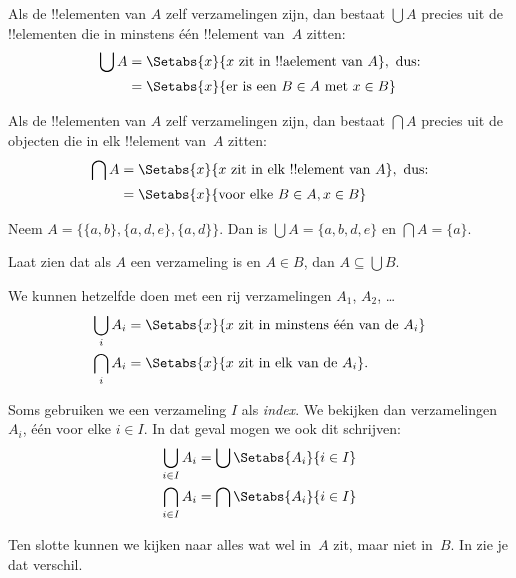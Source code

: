 \documentclass[../../../include/open-logic-section]{subfiles}
\begin{document}
\begin{defn}
Als de !!{element}en van $A$ zelf verzamelingen zijn, dan bestaat $\bigcup A$
precies uit de !!{element}en die in minstens één !!{element} van~$A$ zitten:
\begin{align*}
\bigcup A & = \Setabs{x}{x \text{ zit in !!a{element} van } A},
\text{ dus:}\\
& = \Setabs{x}{\text{er is een } B \in A
  \text{ met } x \in B}
\end{align*}
\end{defn}

\begin{defn}
Als de !!{element}en van $A$ zelf verzamelingen zijn, dan bestaat $\bigcap A$
precies uit de objecten die in elk !!{element} van~$A$ zitten:
\begin{align*}
\bigcap A & = \Setabs{x}{x \text{ zit in elk !!{element} van } A},
\text{ dus:}\\
 & = \Setabs{x}{\text{voor elke } B \in A, x \in B}
\end{align*}
\end{defn}

\begin{ex}
Neem $A = \{ \{ a, b \}, \{ a, d, e \}, \{ a, d \} \}$.
Dan is $\bigcup A = \{ a, b, d, e \}$ en $\bigcap A = \{ a \}$.
\end{ex}
\begin{prob}
	Laat zien dat als $A$ een verzameling is en $A \in B$, dan
	$A \subseteq \bigcup B$.
\end{prob}

We kunnen hetzelfde doen met een rij verzamelingen $A_1$, $A_2$, \dots
\begin{align*}
\bigcup_i A_i & = \Setabs{x}{x \text{ zit in minstens één van de } A_i}\\
\bigcap_i A_i & = \Setabs{x}{x \text{ zit in elk van de } A_i}.
\end{align*}

Soms gebruiken we een verzameling $I$ als \emph{index}. We bekijken dan
verzamelingen $A_i$, één voor elke $i \in I$. In dat geval mogen we ook dit
schrijven:
\begin{align*}
	\bigcup_{i \in I} A_i & = \bigcup \Setabs{A_i }{i \in I}\\
	\bigcap_{i \in I} A_i & = \bigcap\Setabs{A_i}{i \in I}
\end{align*}

Ten slotte kunnen we kijken naar alles wat wel in~$A$ zit, maar niet in~$B$.
In  zie je dat verschil.
\end{document}
